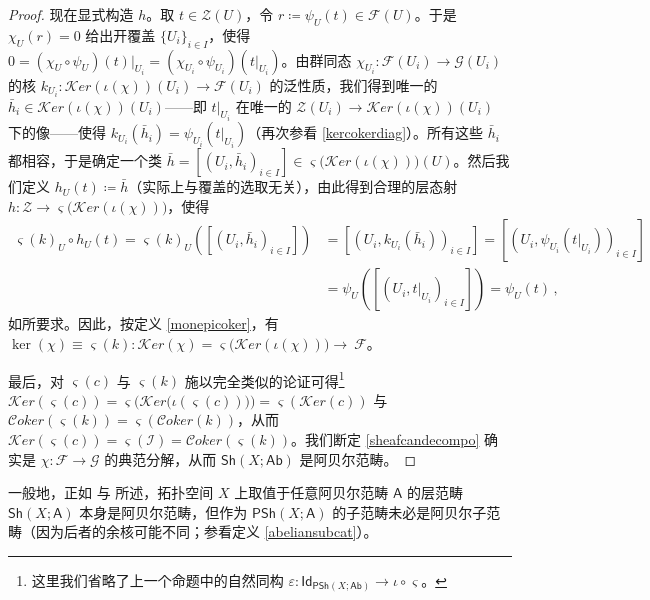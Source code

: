 \begin{proof}
现在显式构造 $h$。取 $t\in\mathcal{Z}(U)$，令 $r\coloneqq\psi_U(t)\in\mathcal{F}(U)$。于是 $\chi_U(r)=0$ 给出开覆盖 $\{U_i\}_{i\in I}$，使得 $0=(\chi_U\circ\psi_U)(t)|_{U_i}=(\chi_{U_i}\circ\psi_{U_i})(t|_{U_i})$。由群同态 $\chi_{U_i}:\mathcal{F}(U_i)\rightarrow\mathcal{G}(U_i)$ 的核 $k_{U_i}:\mathcal{K}er(\iota(\chi))(U_i)\rightarrow\mathcal{F}(U_i)$ 的泛性质，我们得到唯一的 $\bar{h}_i\in\mathcal{K}er(\iota(\chi))(U_i)$——即 $t|_{U_i}$ 在唯一的 $\mathcal{Z}(U_i)\rightarrow\mathcal{K}er(\iota(\chi))(U_i)$ 下的像——使得 $k_{U_i}(\bar{h}_i)=\psi_{U_i}(t|_{U_i})$（再次参看 \eqref{kercokerdiag}）。所有这些 $\bar{h}_i$ 都相容，于是确定一个类 $\bar{h}=[(U_i,\bar{h}_i)_{i\in I}]\in\varsigma\big(\mathcal{K}er(\iota(\chi))\big)(U)$。然后我们定义 $h_U(t)\coloneqq\bar{h}$（实际上与覆盖的选取无关），由此得到合理的层态射 $h:\mathcal{Z}\rightarrow\varsigma\big(\mathcal{K}er(\iota(\chi))\big)$，使得
\begin{align*}
	\varsigma(k)_U\circ h_U(t)=\varsigma(k)_U([(U_i,\bar{h}_i)_{i\in I}])&=[(U_i,k_{U_i}(\bar{h}_i))_{i\in I}]=[(U_i,\psi_{U_i}(t|_{U_i}))_{i\in I}] \\
	&=\psi_U([(U_i,t|_{U_i})_{i\in I}])=\psi_U(t)\,,
\end{align*} 
如所要求。因此，按定义 \ref{monepicoker}，有 $\ker(\chi)\equiv\varsigma(k):\mathcal{K}er(\chi)=\varsigma\big(\mathcal{K}er(\iota(\chi))\big)\rightarrow~\mathcal{F}$。

最后，对 $\varsigma(c)$ 与 $\varsigma(k)$ 施以完全类似的论证可得\footnote{这里我们省略了上一个命题中的自然同构 $\varepsilon:\mathsf{Id}_{\mathsf{PSh}(X;\mathsf{Ab})}\rightarrow\iota\circ\varsigma$。} $\mathcal{K}er(\varsigma(c))\!=\varsigma\big(\mathcal{K}er\big(\iota(\varsigma(c))\big)\big)\!=\varsigma(\mathcal{K}er(c))$ 与 $\mathcal{C}oker(\varsigma(k))\!=\varsigma(\mathcal{C}oker(k))$，从而 $\mathcal{K}er(\varsigma(c))=\varsigma(\mathcal{I})=\mathcal{C}oker(\varsigma(k))$。我们断定 \eqref{sheafcandecompo} 确实是 $\chi:\mathcal{F}\rightarrow\mathcal{G}$ 的典范分解，从而 $\mathsf{Sh}(X;\mathsf{Ab})$ 是阿贝尔范畴。
\end{proof}

\begin{Rem}
一般地，正如 \cite[section 1.6]{[Wei94]} 与 \cite[Theorem 17.4.9]{[KS06]} 所述，拓扑空间 $X$ 上取值于任意阿贝尔范畴 $\mathsf{A}$ 的层范畴 $\mathsf{Sh}(X;\mathsf{A})$ 本身是阿贝尔范畴，但作为 $\mathsf{PSh}(X;\mathsf{A})$ 的子范畴未必是阿贝尔子范畴（因为后者的余核可能不同；参看定义 \ref{abeliansubcat}）。
\end{Rem}


